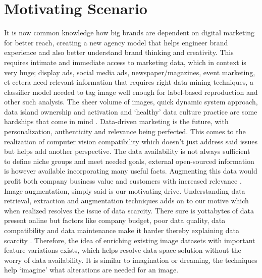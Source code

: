 \documentclass[preprint,12pt]{elsarticle}
\begin{document}
\section{Motivating Scenario}
\label{S:2}
It is now common knowledge how big brands are dependent on digital marketing for better reach, creating a new agency model that helps engineer brand experience and also better understand brand thinking and creativity. This requires intimate and immediate access to marketing data, which in context is very huge; display ads, social media ads, newspaper/magazines, event marketing, et cetera need relevant information that requires right data mining techniques, a classifier model needed to tag image well enough for label-based reproduction and other such analysis. The sheer volume of images, quick dynamic system approach, data island ownership and activation and ‘healthy’ data culture practice are some hardships that come in mind \cite{Mike2018}. 
Data-driven marketing is the future, with personalization, authenticity and relevance being perfected. This comes to the realization of computer vision compatibility which doesn’t just address said issues but helps add another perspective. The data availability is not always sufficient to define niche groups and meet needed goals, external open-sourced information is however available incorporating many useful facts. Augmenting this data would profit both company business value and customers with increased relevance \cite{Stef2019}.
Image augmentation, simply said is our motivating drive. Understanding data retrieval, extraction and augmentation techniques adds on to our motive which when realized resolves the issue of data scarcity. There sure is yottabytes of data present online but factors like company budget, poor data quality, data compatibility and data maintenance make it harder thereby explaining data scarcity .  Therefore, the idea of enriching existing image datasets with important feature variations exists, which helps resolve data-space solution without the worry of data availability. It is similar to imagination or dreaming, the techniques help ‘imagine’ what alterations are needed for an image.
\end{document}
